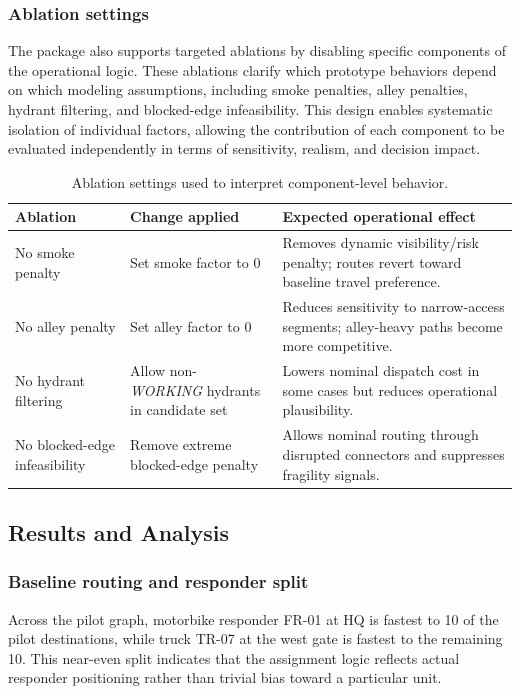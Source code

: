\subsubsection{Ablation settings}
The package also supports targeted ablations by disabling specific components of the operational logic. These ablations clarify which prototype behaviors depend on which modeling assumptions, including smoke penalties, alley penalties, hydrant filtering, and blocked-edge infeasibility. This design enables systematic isolation of individual factors, allowing the contribution of each component to be evaluated independently in terms of sensitivity, realism, and decision impact.


\begin{table}[!t]
\caption{Ablation settings used to interpret component-level behavior.}
\label{tab:ablation}
\centering
\scriptsize
\setlength{\tabcolsep}{4pt}
\renewcommand{\arraystretch}{0.96}
\begin{tabular}{L{2.3cm} L{1.8cm} L{3.2cm}}
\toprule
Ablation & Change applied & Expected operational effect \\
\midrule
No smoke penalty & Set smoke factor to 0 & Removes dynamic visibility/risk penalty; routes revert toward baseline travel preference. \\
No alley penalty & Set alley factor to 0 & Reduces sensitivity to narrow-access segments; alley-heavy paths become more competitive. \\
No hydrant filtering & Allow non-\textit{WORKING} hydrants in candidate set & Lowers nominal dispatch cost in some cases but reduces operational plausibility. \\
No blocked-edge infeasibility & Remove extreme blocked-edge penalty & Allows nominal routing through disrupted connectors and suppresses fragility signals. \\
\bottomrule
\end{tabular}
\end{table}

\subsection{Results and Analysis}

\subsubsection{Baseline routing and responder split}
Across the pilot graph, motorbike responder FR-01 at HQ is fastest to 10 of the pilot destinations, while truck TR-07 at the west gate is fastest to the remaining 10. This near-even split indicates that the assignment logic reflects actual responder positioning rather than trivial bias toward a particular unit.


